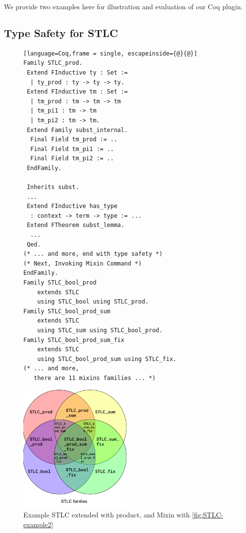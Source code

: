\newpage{}
We provide two examples here for illustration and evaluation of our Coq plugin. 

\subsection{Type Safety for STLC}

\begin{figure}
\begin{lstlisting}[language=Coq,frame = single, escapeinside={@}{@}]
Family STLC_prod.
 Extend FInductive ty : Set :=
  | ty_prod : ty -> ty -> ty.
 Extend FInductive tm : Set :=
  | tm_prod : tm -> tm -> tm  
  | tm_pi1 : tm -> tm  
  | tm_pi2 : tm -> tm.
 Extend Family subst_internal.
  Final Field tm_prod := ..
  Final Field tm_pi1 := ..
  Final Field tm_pi2 := ..
 EndFamily.

 Inherits subst.
 ...
 Extend FInductive has_type 
  : context -> term -> type := ...
 Extend FTheorem subst_lemma.
  ... 
 Qed.
(* ... and more, end with type safety *)
(* Next, Invoking Mixin Command *)
EndFamily.
Family STLC_bool_prod 
    extends STLC 
    using STLC_bool using STLC_prod.
Family STLC_bool_prod_sum 
    extends STLC 
    using STLC_sum using STLC_bool_prod.
Family STLC_bool_prod_sum_fix 
    extends STLC 
    using STLC_bool_prod_sum using STLC_fix.
(* ... and more, 
   there are 11 mixins families ... *)
\end{lstlisting}
\includegraphics[width=0.5\textwidth]{coqexmaple/Mixin-Venn-Diagram.pdf}
\caption{Example STLC extended with product, and Mixin with \cref{fig:STLC-example2}}
\end{figure}

